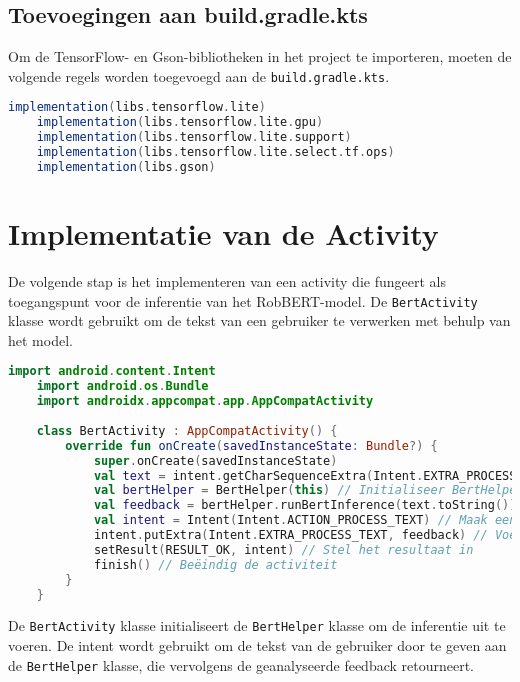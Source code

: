 \subsection{Toevoegingen aan build.gradle.kts}

Om de TensorFlow- en Gson-bibliotheken in het project te importeren, moeten de volgende regels worden toegevoegd aan de \texttt{build.gradle.kts}.

\begin{lstlisting}[language=Groovy, caption={Toevoegingen aan build.gradle.kts}]
    implementation(libs.tensorflow.lite)
    implementation(libs.tensorflow.lite.gpu)
    implementation(libs.tensorflow.lite.support)
    implementation(libs.tensorflow.lite.select.tf.ops)
    implementation(libs.gson)
\end{lstlisting}

\section{Implementatie van de Activity}

De volgende stap is het implementeren van een activity die fungeert als toegangspunt voor de inferentie van het RobBERT-model. De \texttt{BertActivity} klasse wordt gebruikt om de tekst van een gebruiker te verwerken met behulp van het model.

\begin{lstlisting}[language=Kotlin, caption={Implementatie van BertActivity}]
    import android.content.Intent
    import android.os.Bundle
    import androidx.appcompat.app.AppCompatActivity
    
    class BertActivity : AppCompatActivity() {
        override fun onCreate(savedInstanceState: Bundle?) {
            super.onCreate(savedInstanceState)
            val text = intent.getCharSequenceExtra(Intent.EXTRA_PROCESS_TEXT) // Haal de tekst op van de intent
            val bertHelper = BertHelper(this) // Initialiseer BertHelper
            val feedback = bertHelper.runBertInference(text.toString()) // Voer de inferentie uit en krijg feedback
            val intent = Intent(Intent.ACTION_PROCESS_TEXT) // Maak een nieuwe intent aan
            intent.putExtra(Intent.EXTRA_PROCESS_TEXT, feedback) // Voeg de feedback toe aan de intent
            setResult(RESULT_OK, intent) // Stel het resultaat in
            finish() // Beëindig de activiteit
        }
    }
\end{lstlisting}

De \texttt{BertActivity} klasse initialiseert de \texttt{BertHelper} klasse om de inferentie uit te voeren. De intent wordt gebruikt om de tekst van de gebruiker door te geven aan de \texttt{BertHelper} klasse, die vervolgens de geanalyseerde feedback retourneert.

